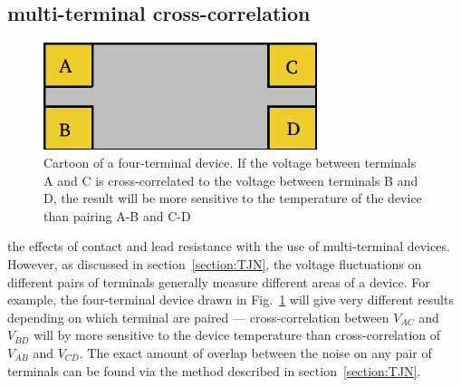 \subsection{multi-terminal cross-correlation}
\begin{figure}
\centering
\includegraphics[width=80mm]{figures/Johnson_noise_thermometry/4terminal.png}
\caption{Cartoon of a four-terminal device. If the voltage between terminals A and C is cross-correlated to the voltage between terminals B and D, the result will be more sensitive to the temperature of the device than pairing A-B and C-D}
\label{fig:4terminal}
\end{figure}
 the effects of contact and lead resistance with the use of multi-terminal devices. However, as discussed in section~\ref{section:TJN}, the voltage fluctuations on different pairs of terminals generally measure different areas of a device. For example, the four-terminal device drawn in Fig.~\ref{fig:4terminal} will give very different results depending on which terminal are paired --- cross-correlation between $V_{AC}$ and $V_{BD}$ will by more sensitive to the device temperature than cross-correlation of $V_{AB}$ and $V_{CD}$. The exact amount of overlap between the noise on any pair of terminals can be found via the method described in section~\ref{section:TJN}.


